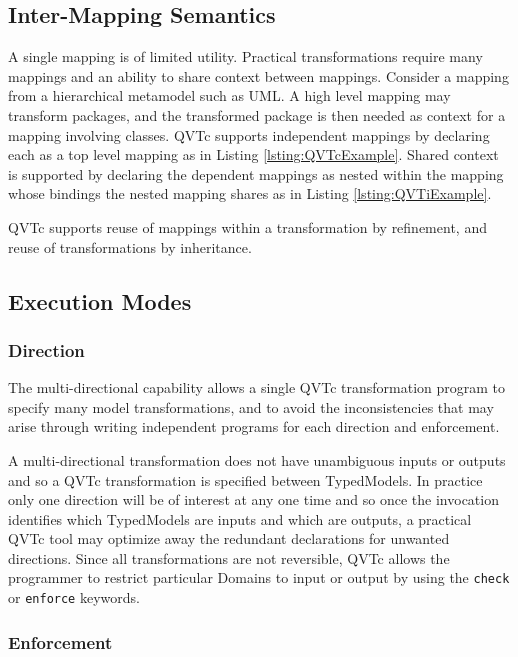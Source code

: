 \subsection{Inter-Mapping Semantics}

A single mapping is of limited utility. Practical transformations require many mappings and an ability to share context between mappings. Consider a mapping from a hierarchical metamodel such as UML. A high level mapping may transform packages, and the transformed package is then needed as context for a mapping involving classes. QVTc supports independent mappings by declaring each as a top level mapping as in Listing \ref{lsting:QVTcExample}. Shared context is supported by declaring the dependent mappings as nested within the mapping whose bindings the nested mapping shares as in Listing \ref{lsting:QVTiExample}.

QVTc supports reuse of mappings within a transformation by refinement, and reuse of transformations by inheritance.

\subsection{Execution Modes}

\subsubsection{Direction}\label{Direction}

The multi-directional capability allows a single QVTc transformation program to specify many model transformations, and to avoid the inconsistencies that may arise through writing independent programs for each direction and enforcement.

A multi-directional transformation does not have unambiguous inputs or outputs and so a QVTc transformation is specified between TypedModels. In practice only one direction will be of interest at any one time and so once the invocation identifies which TypedModels are inputs and which are outputs, a practical QVTc tool may optimize away the redundant declarations for unwanted directions. Since all transformations are not reversible, QVTc allows the programmer to restrict particular Domains to input or output by using the \texttt{check} or \texttt{enforce} keywords.

\subsubsection{Enforcement}\label{Enforcement}

